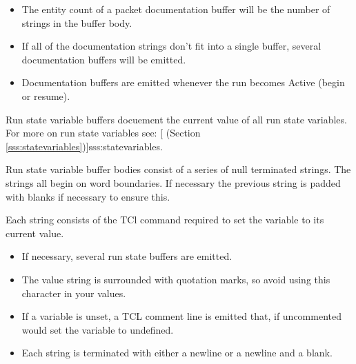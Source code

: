       \begin{note}
         \begin{itemize}
         \item The entity count of a packet documentation
            buffer will be the number of strings in the
            buffer body.
         \item If all of the documentation strings don't fit into
            a single buffer, several documentation buffers will
            be emitted.
         \item Documentation buffers are emitted whenever
               the run becomes Active (begin or resume).
         \end{itemize}
      \end{note}
         Run state variable buffers docuement the current
         value of all run state variables.  For more on 
         run state variables see:
         [
            (Section \ref{sss:statevariables})]{sss:statevariables}.
         
         Run state variable buffer bodies consist of a 
         series of null terminated strings.  The strings
         all begin on word boundaries.  If necessary 
         the previous string is padded with blanks if 
         necessary to ensure this.
         
         Each string consists of the TCl command required
         to set the variable to its current value.
         
         \begin{note}
            \begin{itemize}
               \item If necessary, several run state
                  buffers are emitted.
               \item The value string is surrounded with
                  quotation marks, so avoid using this
                  character in your values.
               \item If a variable is unset, a TCL comment
                  line is emitted that, if uncommented
                  would set the variable to {\dash}undefined{\dash}.
               \item Each string is terminated with either
                  a newline or a newline and a blank.
            \end{itemize}
         \end{note}
         
